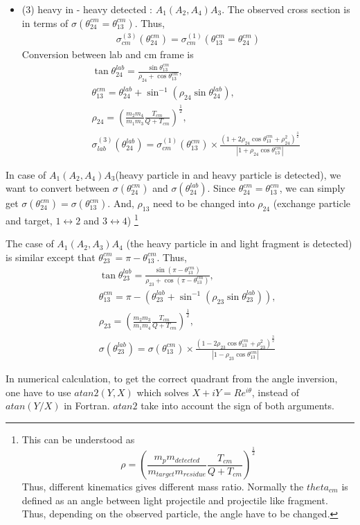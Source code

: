 \documentclass[10pt]{book}
\newcommand{\bea}{\begin{eqnarray}}
\newcommand{\eea}{\end{eqnarray}}
\newcommand{\no}{\nonumber \\}
\begin{document}
\begin{itemize}
	\item (3) heavy in - heavy detected : $A_1(A_2,A_4)A_3$.
	       The observed cross section is in terms of $\sigma(\theta_{24}^{cm}=\theta_{13}^{cm})$.
	       Thus, 
	       \bea 
	       \sigma^{(3)}_{cm}(\theta_{24}^{cm}) = \sigma^{(1)}_{cm}(\theta_{13}^{cm}=\theta_{24}^{cm})
	       \eea 
	       Conversion between lab and cm frame is 
	       \bea 
	       & &\tan\theta_{24}^{lab}=\frac{\sin\theta_{13}^{cm}}{\rho_{24}+\cos\theta_{13}^{cm}}, \no 
	       & & \theta_{13}^{cm}=\theta^{lab}_{24}+\sin^{-1}(\rho_{24}\sin\theta_{24}^{lab}),\no 
	       & &\rho_{24}=\left(\frac{m_2 m_4}{m_1 m_3}\frac{T_{cm}}{Q+T_{cm}}\right)^{\frac{1}{2}},\no 
	       & & \sigma^{(3)}_{lab}(\theta_{24}^{lab})=\sigma^{(1)}_{cm}(\theta_{13}^{cm})\times \frac{(1+2\rho_{24} \cos\theta_{13}^{cm}+\rho^2_{24})^{\frac{3}{2}}}
	       {|1+\rho_{24} \cos\theta_{13}^{cm}|} 
	       \eea 
\end{itemize}

In case of  $A_1(A_2,A_4)A_3$(heavy particle in and heavy particle is detected),
we want to convert between $\sigma(\theta_{24}^{cm})$ and $\sigma(\theta_{24}^{lab})$.
Since $\theta_{24}^{cm}=\theta_{13}^{cm}$, we can simply get 
$\sigma(\theta_{24}^{cm})=\sigma(\theta_{13}^{cm})$. And, $\rho_{13}$ need to be changed into
$\rho_{24}$ (exchange particle and target, $1\leftrightarrow 2$ and $3\leftrightarrow 4$)
\footnote{
This can be understood as
$$ 
\rho=\left(\frac{m_{p} m_{detected} }{m_{target} m_{residue}}\frac{T_{cm}}{Q+T_{cm}}\right)^{\frac{1}{2}}
$$
Thus, different kinematics gives different mass ratio. 
Normally the $theta_{cm}$ is defined as an angle between light projectile  
and projectile like fragment. 
Thus, depending on the observed particle, the angle have to be changed. 
} 


The case of $A_1(A_2,A_3)A_4$ (the heavy particle in and light fragment is detected)
is similar except that $\theta_{23}^{cm}=\pi-\theta_{13}^{cm}$.
Thus,
\bea 
& &\tan\theta_{23}^{lab}=\frac{\sin(\pi-\theta_{13}^{cm})}{\rho_{23}+\cos(\pi-\theta_{13}^{cm})}, \no 
& & \theta_{13}^{cm}=\pi-(\theta_{23}^{lab}+\sin^{-1}(\rho_{23} \sin\theta_{23}^{lab})),\no 
& &\rho_{23}=\left(\frac{m_2 m_3}{m_1 m_4}\frac{T_{cm}}{Q+T_{cm}}\right)^{\frac{1}{2}},\no 
& & \sigma(\theta_{23}^{lab})=\sigma(\theta_{13}^{cm})\times \frac{(1-2\rho_{23} \cos\theta_{13}^{cm}+\rho^2_{23})^{\frac{3}{2}}}
   {|1-\rho_{23} \cos\theta_{13}^{cm}|} 
\eea 

In numerical calculation, to get the correct quadrant from the angle inversion, 
one have to use $atan 2(Y,X)$ which solves $X+i Y =R e^{i\theta}$,
instead of $atan(Y/X)$ in Fortran. $atan2$ take into account the sign of both arguments. 
\end{document}
